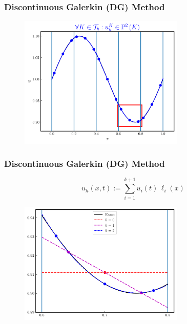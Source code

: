 \documentclass{beamer}
\begin{document}
\begin{frame}
\frametitle{Discontinuous Galerkin (DG) Method}

  \begin{figure}[htb!]
    \centering
    \includegraphics[width=0.7\textwidth]{fig.sine_k2_box.png}
  \end{figure}

\end{frame}

\begin{frame}
\frametitle{Discontinuous Galerkin (DG) Method}

  \Fontvi

  \begin{equation*}
    u_{h}\left(x,t\right)
    :=\sum\limits_{i=1}^{k+1}
      u_{i}\left(t\right)\,\ell_{i}\left(x\right)
  \end{equation*}

  \begin{figure}[htb!]
    \centering
    \includegraphics[width=0.7\textwidth]{fig.DG_1D.png}
  \end{figure}

\end{frame}
\end{document}
